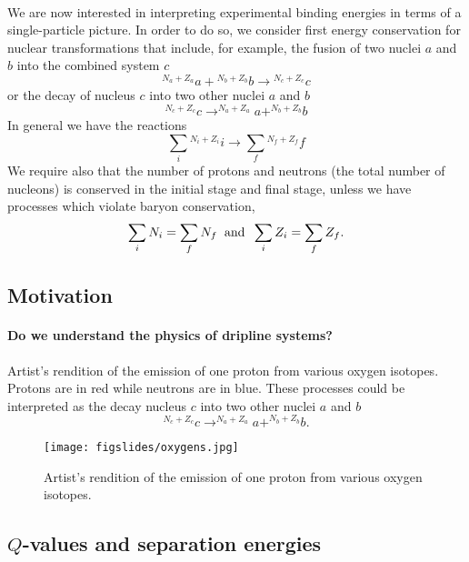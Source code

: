 \documentclass[%
twoside,                 %
final,                   %
10pt]{article}
\begin{document}
\paragraph{}
We are now interested in interpreting experimental binding energies  in terms of a single-particle picture.
In order to do so, we  consider first energy conservation for nuclear transformations that include, for
example, the fusion of two nuclei $a$ and $b$ into the combined system $c$
\[
{^{N_a+Z_a}}a+ {^{N_b+Z_b}}b\rightarrow {^{N_c+Z_c}}c
\]
or the decay of nucleus $c$ into two other nuclei $a$ and $b$
\[
^{N_c+Z_c}c \rightarrow  ^{N_a+Z_a}a+ ^{N_b+Z_b}b
\]
In general we have the reactions
\[
\sum_i {^{N_i+Z_i}}i \rightarrow  \sum_f {^{N_f+Z_f}}f
\]
We require also that the number of protons and neutrons (the total number of nucleons) is conserved in the initial stage and final stage, unless we have processes which violate baryon conservation, 
\[
\sum_iN_i = \sum_f N_f \hspace{0.2cm}\mathrm{and} \hspace{0.2cm}\sum_iZ_i = \sum_f Z_f.
\]



\subsection*{Motivation}

\paragraph{Do we understand the physics of dripline systems?}
Artist's rendition of the emission of one proton from various oxygen isotopes. Protons are in red while neutrons are in blue. These processes could be interpreted as the decay
nucleus $c$ into two other nuclei $a$ and $b$
\[
^{N_c+Z_c}c \rightarrow  ^{N_a+Z_a}a+ ^{N_b+Z_b}b .
\]

\begin{figure}[ht]
  \centerline{\texttt{[image: figslides/oxygens.jpg]}}
  \caption{
  Artist's rendition of the emission of one proton from various oxygen isotopes.
  }
\end{figure}




\subsection*{$Q$-values and separation energies}
\end{document}
